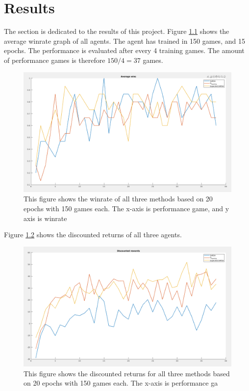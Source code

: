 \chapter{Results} \label{ch:results}


The section is dedicated to the results of this project. Figure \ref{fig:winrate_graph} shows the average winrate graph of all agents. The agent has trained in 150 games, and 15 epochs. The performance is evaluated after every 4 training games. The amount of performance games is therefore $150/4 = 37$ games.

\begin{figure}[H]
    \centering
    \includegraphics[width=\linewidth]{img/Win_rate_graph.png}
    \caption{This figure shows the winrate of all three methods based on 20 epochs with 150 games each. The x-axis is performance game, and y axis is winrate}
    \label{fig:winrate_graph}
\end{figure}

Figure \ref{fig:discounted_returns} shows the discounted returns of all three agents.

\begin{figure}[H]
    \centering
    \includegraphics[width=\linewidth]{img/Discounted_rewards.png}
    \caption{This figure shows the discounted returns for all three methods based on 20 epochs with 150 games each. The x-axis is performance ga}
    \label{fig:discounted_returns}
\end{figure}
